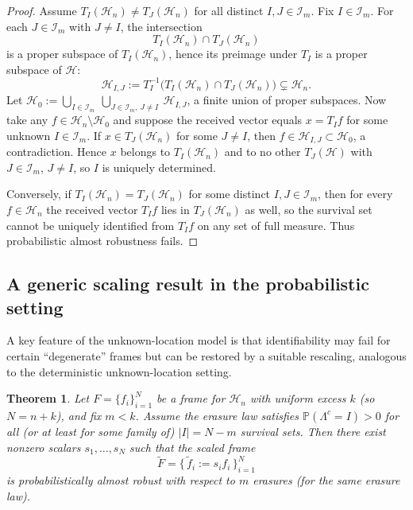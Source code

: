 \documentclass[final,1p,times]{elsarticle}
\newtheorem{thm}{Theorem}[section]
\begin{document}
\begin{proof}

Assume $T_I(\mathcal H_n)\neq T_J(\mathcal H_n)$ for all distinct $I,J\in\mathcal I_m$.
Fix $I\in\mathcal I_m$.
For each $J\in\mathcal I_m$ with $J\neq I$, the intersection
\[
T_I(\mathcal H_n)\cap T_J(\mathcal H_n)
\]
is a proper subspace of $T_I(\mathcal H_n)$, hence its preimage under $T_I$ is a proper subspace of $\mathcal H$:
\[
\mathcal H_{I,J}:=T_I^{-1}\big(T_I(\mathcal H_n)\cap T_J(\mathcal H_n)\big)\subsetneq \mathcal H_n.
\]
Let $\mathcal H_0:=\bigcup_{I\in\mathcal I_m}\ \bigcup_{J\in\mathcal I_m,\ J\neq I}\ \mathcal H_{I,J}$,
a finite union of proper subspaces.
Now take any $f\in\mathcal H_n\setminus\mathcal H_0$ and suppose the received vector equals $x=T_I f$ for some
unknown $I\in\mathcal I_m$.
If $x\in T_J(\mathcal H_n)$ for some $J\neq I$, then $f\in \mathcal H_{I,J}\subset\mathcal H_0$, a contradiction.
Hence $x$ belongs to $T_I(\mathcal H_n)$ and to no other $T_J(\mathcal H)$ with $J\in\mathcal I_m$, $J\neq I$,
so $I$ is uniquely determined.


Conversely, if $T_I(\mathcal H_n)=T_J(\mathcal H_n)$ for some distinct $I,J\in\mathcal I_m$, then for every $f\in\mathcal H_n$
the received vector $T_I f$ lies in $T_J(\mathcal H_n)$ as well, so the survival set cannot be uniquely identified from
$T_I f$ on any set of full measure. Thus probabilistic almost robustness fails.
\end{proof}

\subsection{A generic scaling result in the probabilistic setting}

A key feature of the unknown-location model is that identifiability may fail for certain ``degenerate'' frames but can be
restored by a suitable rescaling, analogous to the deterministic unknown-location setting.

\begin{thm}
\label{thm:prob_scaling}
Let $F=\{f_i\}_{i=1}^N$ be a frame for $\mathcal H_n$ with uniform excess $k$ (so $N=n+k$), and fix $m<k$.
Assume the erasure law satisfies $\mathbb P(\Lambda^c=I)>0$ for all (or at least for some family of) $|I|=N-m$ survival sets.
Then there exist nonzero scalars $s_1,\dots,s_N$ such that the scaled frame
\[
\widetilde F=\{\,\widetilde f_i:=s_i f_i\,\}_{i=1}^N
\]
is probabilistically almost robust with respect to $m$ erasures (for the same erasure law).
\end{thm}
\end{document}
